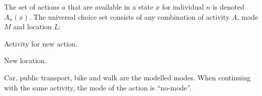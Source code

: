 


%
The set of actions $a$ that are available in a state $x$ for individual $n$ is denoted $A_n(x)$. The universal choice set consists of any combination of activity $A$, mode $M$ and location $L$:
\begin{description}[style=multiline,leftmargin=4cm,font=\normalfont]
\item[{Activity $A$}:] Activity for new action.
\item[{Location $L$}:] New location. 
\item[{Mode}:] Car, public transport, bike and walk are the modelled modes. When continuing with the same activity, the mode of the action is ``no-mode''.
\end{description}

